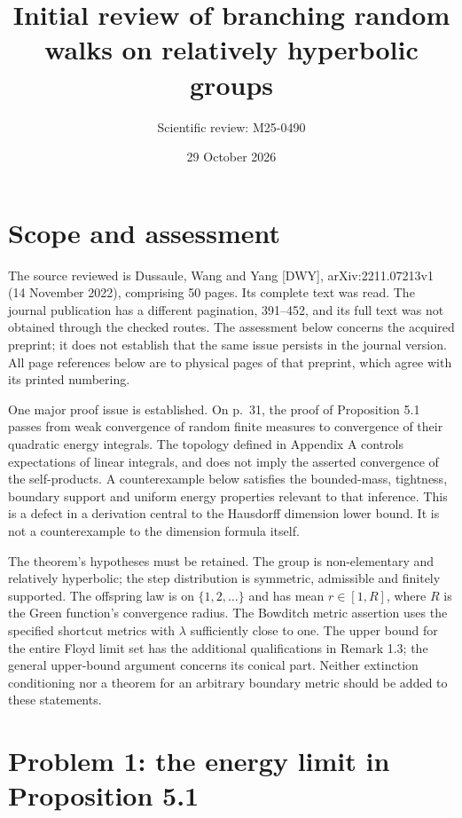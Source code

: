 \documentclass[10pt]{article}
\title{Initial review of branching random walks
on relatively hyperbolic groups}
\author{Scientific review: M25-0490}
\date{29 October 2026}
\begin{document}
\maketitle
\section*{Scope and assessment}
The source reviewed is Dussaule, Wang and Yang [DWY], arXiv:2211.07213v1 (14 November 2022), comprising 50 pages. Its complete text was read. The journal publication has a different pagination, 391–452, and its full text was not obtained through the checked routes. The assessment below concerns the acquired preprint; it does not establish that the same issue persists in the journal version. All page references below are to physical pages of that preprint, which agree with its printed numbering.\par
One major proof issue is established. On p. 31, the proof of Proposition 5.1 passes from weak convergence of random finite measures to convergence of their quadratic energy integrals. The topology defined in Appendix A controls expectations of linear integrals, and does not imply the asserted convergence of the self-products. A counterexample below satisfies the bounded-mass, tightness, boundary support and uniform energy properties relevant to that inference. This is a defect in a derivation central to the Hausdorff dimension lower bound. It is not a counterexample to the dimension formula itself.\par
The theorem’s hypotheses must be retained. The group is non-elementary and relatively hyperbolic; the step distribution is symmetric, admissible and finitely supported. The offspring law is on \(\{1,2,\ldots\}\) and has mean \(r\in[1,R]\), where \(R\) is the Green function’s convergence radius. The Bowditch metric assertion uses the specified shortcut metrics with \(\lambda\) sufficiently close to one. The upper bound for the entire Floyd limit set has the additional qualifications in Remark 1.3; the general upper-bound argument concerns its conical part. Neither extinction conditioning nor a theorem for an arbitrary boundary metric should be added to these statements.\par
\section*{Problem 1: the energy limit in Proposition 5.1}
\end{document}
